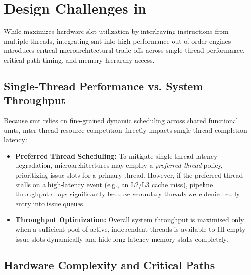 \section{Design Challenges in }
\label{sec:smt_design_challenges}

While  maximizes hardware slot utilization by interleaving instructions from multiple threads, integrating \gls{smt} into high-performance out-of-order engines introduces critical microarchitectural trade-offs across single-thread performance, critical-path timing, and memory hierarchy access.

\subsection{Single-Thread Performance vs. System Throughput}

Because \gls{smt} relies on fine-grained dynamic scheduling across shared functional units, inter-thread resource competition directly impacts single-thread completion latency:
\begin{itemize}
    \item \textbf{Preferred Thread Scheduling:} To mitigate single-thread latency degradation, microarchitectures may employ a \textit{preferred thread} policy, prioritizing issue slots for a primary thread. However, if the preferred thread stalls on a high-latency event (e.g., an L2/L3 cache miss), pipeline throughput drops significantly because secondary threads were denied early entry into issue queues.
    \item \textbf{Throughput Optimization:} Overall system throughput is maximized only when a sufficient pool of active, independent threads is available to fill empty issue slots dynamically and hide long-latency memory stalls completely.
\end{itemize}

\subsection{Hardware Complexity and Critical Paths}

